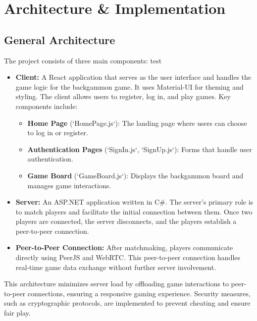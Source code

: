 \documentclass[ twoside,openright,titlepage,numbers=noenddot,headinclude,%
                footinclude=true,cleardoublepage=empty,abstractoff, %
                BCOR=5mm,paper=a4,fontsize=11pt,%
                ngerman,american,%
                ]{scrreprt}
\begin{document}
\chapter{Architecture \& Implementation}
\label{cha:arch--impl}

\section{General Architecture}
The project consists of three main components: test

\begin{itemize}
  \item \textbf{Client:} A React application that serves as the user interface and handles the game logic for the backgammon game. It uses Material-UI for theming and styling. The client allows users to register, log in, and play games. Key components include:

  \begin{itemize}
    \item \textbf{Home Page} (`HomePage.js`): The landing page where users can choose to log in or register.
    \item \textbf{Authentication Pages} (`SignIn.js`, `SignUp.js`): Forms that handle user authentication.
    \item \textbf{Game Board} (`GameBoard.js`): Displays the backgammon board and manages game interactions.
  \end{itemize}
  
  \item \textbf{Server:} An ASP.NET application written in C\#. The server's primary role is to match players and facilitate the initial connection between them. Once two players are connected, the server disconnects, and the players establish a peer-to-peer connection.
  
  \item \textbf{Peer-to-Peer Connection:} After matchmaking, players communicate directly using PeerJS and WebRTC. This peer-to-peer connection handles real-time game data exchange without further server involvement.

\end{itemize}

This architecture minimizes server load by offloading game interactions to peer-to-peer connections, ensuring a responsive gaming experience. Security measures, such as cryptographic protocols, are implemented to prevent cheating and ensure fair play.
\end{document}
